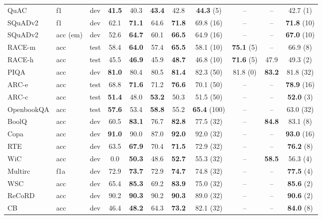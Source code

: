 \documentclass{article}
\begin{document}
\begin{table*}[b]
\begin{tabular}{llccccccccc}
        QuAC & f1 & dev & \textbf{41.5} & 40.3
& \textbf{43.4} & 42.8 & \textbf{44.3} (5) & -- & -- & 42.7 (1) \\
        SQuADv2 & f1 & dev & 62.1 & \textbf{71.1}
& 64.6 & \textbf{71.8} & 69.8 (16) & -- & --& \textbf{71.8} (10)\\
SQuADv2 & acc (em) & dev & 52.6 & \textbf{64.7} & 60.1 & \textbf{66.5} & 64.9 (16) & -- & --& \textbf{67.0} (10)\\
RACE-m & acc & test & 58.4 & \textbf{64.0}
& 57.4 & \textbf{65.5} & 58.1 (10) & \textbf{75.1} (5)  & -- & 66.9 (8) \\
RACE-h & acc & test & 45.5 & \textbf{46.9} & 45.9 & \textbf{48.7} & 46.8 (10) & \textbf{71.6} (5) & 47.9 & 49.3 (2)\\
\addlinespace
        PIQA & acc & dev & \textbf{81.0} & 80.4 & 80.5 & \textbf{81.4} & 82.3 (50)  & 81.8 (0) & \textbf{83.2} & 81.8 (32) \\
        ARC-e & acc & test & 68.8 & \textbf{71.6}
& 71.2 & \textbf{76.6} & 70.1 (50) & -- & -- & \textbf{78.9} (16)\\
ARC-c & acc & test & \textbf{51.4} & 48.0 & \textbf{53.2} & 50.3 & 51.5 (50) & -- & -- & \textbf{52.0} (3)\\
        OpenbookQA & acc & test & \textbf{57.6} & 53.4 & \textbf{58.8} & 55.2 & \textbf{65.4} (100) & -- & -- & 63.0 (32)\\
        \addlinespace
        BoolQ & acc & dev & 60.5 & \textbf{83.1}
& 76.7 & \textbf{82.8} & 77.5 (32) & -- & \textbf{84.8} & 83.1 (8) \\
Copa & acc & dev & \textbf{91.0} & 90.0 & 87.0 & \textbf{92.0} & 92.0 (32)  & --  & -- & \textbf{93.0} (16)\\
RTE & acc & dev & 63.5 & \textbf{67.9} & 70.4 & \textbf{71.5} & 72.9 (32) & -- & -- & \textbf{76.2} (8) \\
        WiC & acc & dev & 0.0 & \textbf{50.3}
& 48.6 & \textbf{52.7} & 55.3 (32) & -- & \textbf{58.5} & 56.3 (4) \\
Multirc & f1a & dev & 72.9 & \textbf{73.7} & 72.9 & \textbf{74.7} & 74.8 (32) & -- & -- & \textbf{77.5} (4) \\
        WSC & acc & dev & 65.4 & \textbf{85.3} 
& 69.2 & \textbf{83.9} & 75.0 (32)  & -- & -- & \textbf{85.6} (2) \\
ReCoRD & acc & dev & 90.2 & \textbf{90.3} & 90.2 & \textbf{90.3} & 89.0 (32) & -- & -- & \textbf{90.6} (2) \\
        CB & acc & dev & 46.4 & \textbf{48.2} & 64.3 & \textbf{73.2} & 82.1 (32) & -- & -- & \textbf{84.0} (8) \\

\end{tabular}
\end{table*}
\end{document}
